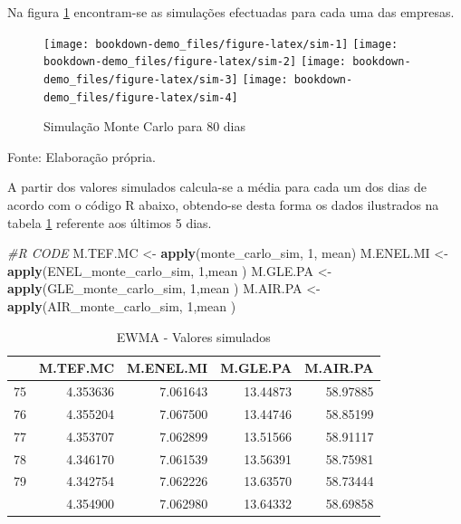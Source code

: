\documentclass[
  12pt,
  a4paper,
  openany]{book}
\newenvironment{Shaded}{\begin{snugshade}}{\end{snugshade}}
\newcommand{\CommentTok}[1]{\textcolor[rgb]{0.56,0.35,0.01}{\textit{#1}}}
\newcommand{\DecValTok}[1]{\textcolor[rgb]{0.00,0.00,0.81}{#1}}
\newcommand{\KeywordTok}[1]{\textcolor[rgb]{0.13,0.29,0.53}{\textbf{#1}}}
\newcommand{\NormalTok}[1]{#1}
\newcommand{\StringTok}[1]{\textcolor[rgb]{0.31,0.60,0.02}{#1}}
\begin{document}
\normalsize

Na figura \ref{fig:sim} encontram-se as simulações efectuadas para cada uma das empresas.

\begin{figure}

{\centering \texttt{[image: bookdown-demo\_files/figure-latex/sim-1]} \texttt{[image: bookdown-demo\_files/figure-latex/sim-2]} \texttt{[image: bookdown-demo\_files/figure-latex/sim-3]} \texttt{[image: bookdown-demo\_files/figure-latex/sim-4]} 

}

\caption{Simulação Monte Carlo para 80 dias}\label{fig:sim}
\end{figure}
\FloatBarrier
\centering

Fonte: Elaboração própria.

\justifying
\bigskip

A partir dos valores simulados calcula-se a média para cada um dos dias de acordo com o código R abaixo, obtendo-se desta forma os dados ilustrados na tabela \ref{tab:simtabewma} referente aos últimos 5 dias.

\scriptsize

\begin{Shaded}
\begin{Highlighting}[]
\CommentTok{\#R CODE}
\NormalTok{M.TEF.MC \textless{}{-}}\StringTok{ }\KeywordTok{apply}\NormalTok{(monte\_carlo\_sim, }\DecValTok{1}\NormalTok{, mean)}
\NormalTok{M.ENEL.MI \textless{}{-}}\StringTok{ }\KeywordTok{apply}\NormalTok{(ENEL\_monte\_carlo\_sim, }\DecValTok{1}\NormalTok{,mean )}
\NormalTok{M.GLE.PA \textless{}{-}}\StringTok{ }\KeywordTok{apply}\NormalTok{(GLE\_monte\_carlo\_sim, }\DecValTok{1}\NormalTok{,mean )}
\NormalTok{M.AIR.PA \textless{}{-}}\StringTok{ }\KeywordTok{apply}\NormalTok{(AIR\_monte\_carlo\_sim, }\DecValTok{1}\NormalTok{,mean )}
\end{Highlighting}
\end{Shaded}

\normalsize

\begin{table}[!h]

\caption{\label{tab:simtabewma}EWMA - Valores simulados}
\centering
\begin{tabular}[t]{lrrrr}
\toprule
  & M.TEF.MC & M.ENEL.MI & M.GLE.PA & M.AIR.PA\\
\midrule
75 & 4.353636 & 7.061643 & 13.44873 & 58.97885\\
76 & 4.355204 & 7.067500 & 13.44746 & 58.85199\\
77 & 4.353707 & 7.062899 & 13.51566 & 58.91117\\
78 & 4.346170 & 7.061539 & 13.56391 & 58.75981\\
79 & 4.342754 & 7.062226 & 13.63570 & 58.73444\\
\addlinespace
80 & 4.354900 & 7.062980 & 13.64332 & 58.69858\\
\bottomrule
\end{tabular}
\end{table}
\FloatBarrier
\centering
\end{document}
